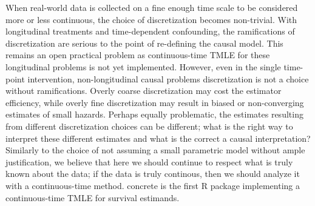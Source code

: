 \documentclass{report}
\newcommand{\1}{\ensuremath{\mathbf{1}}}
\begin{document}
When real-world data is collected on a fine enough time scale to be considered more or less continuous, the choice of discretization becomes non-trivial. With longitudinal treatments and time-dependent confounding, the ramifications of discretization are serious to the point of re-defining the causal model. This remains an open practical problem as continuous-time TMLE for these longitudinal problems is not yet implemented. However, even in the single time-point intervention, non-longitudinal causal problems discretization is not a choice without ramifications. Overly coarse discretization may cost the estimator efficiency, while overly fine discretization may result in biased or non-converging estimates of small hazards. Perhaps equally problematic, the estimates resulting from different discretization choices can be different; what is the right way to interpret these different estimates and what is the correct a causal interpretation? Similarly to the choice of not assuming a small parametric model without ample justification, we believe that here we should continue to respect what is truly known about the data; if the data is truly continous, then we should analyze it with a continuous-time method. concrete is the first R package implementing a continuous-time TMLE for survival estimands.


\newpage

\end{document}

